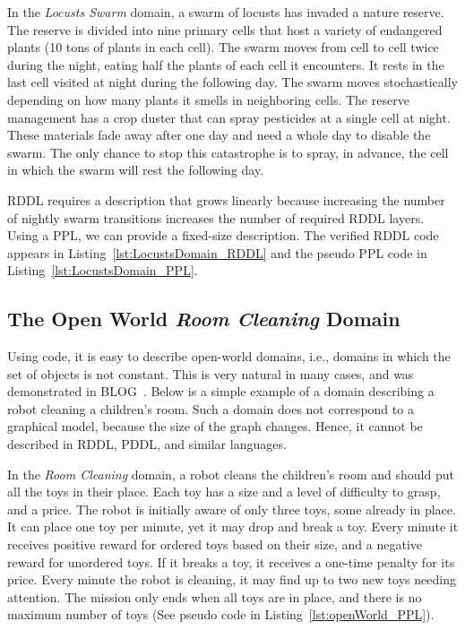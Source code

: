 \documentclass[letterpaper]{article} %
\theoremstyle{definition}
\begin{document}
In the {\em Locusts Swarm} domain, a swarm of locusts has invaded a nature reserve. The reserve is divided into nine primary cells that host a variety of endangered plants (10 tons of plants in each cell). The swarm moves from cell to cell twice during the night, eating half the plants of each cell it encounters.
It rests in the last cell visited at night during the following day.
The swarm moves stochastically depending on how many plants it smells in neighboring cells.
The reserve management has a crop duster that can spray pesticides at a single cell at night. These materials fade away after one day and need a whole day to disable the swarm. The only chance to stop this catastrophe is to spray, in advance, the cell in which the swarm will rest the following day.

RDDL requires a description that grows linearly because
increasing the number of nightly swarm transitions increases the number of required RDDL layers. Using a PPL, we can provide a fixed-size description. The verified RDDL code appears in Listing~\ref{lst:LocustsDomain_RDDL} and the pseudo PPL code in Listing~\ref{lst:LocustsDomain_PPL}.

\subsection{The Open World {\em Room Cleaning} Domain}
Using code, it is easy to describe open-world domains, i.e., domains in which the set of objects is not constant. This is very natural in many cases, and was demonstrated in BLOG~\cite{BLOG}. Below is a simple example of a domain describing a robot cleaning a children's room.
Such a domain does not correspond to a graphical model, because the size of the graph changes. Hence, it cannot be described in RDDL, PDDL, and
similar languages.

In the {\em Room Cleaning} domain, a robot cleans the children's room and should put all the toys in their place.
Each toy has a size and a level of difficulty to grasp, and a price.
The robot is initially aware of only three toys, some already in place.
It can place one toy per minute, yet it may drop and break a toy.
Every minute it receives positive reward for ordered toys based on their size, and a negative reward for unordered toys. If it breaks a toy, it receives a one-time penalty for its price. Every minute the robot is cleaning, it may find up to two new toys needing attention. The mission only ends when all toys are in place, and there is no maximum number of toys (See pseudo code in Listing~\ref{lst:openWorld_PPL}).
\end{document}
